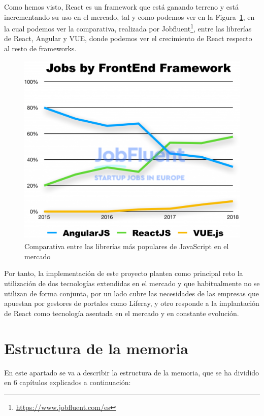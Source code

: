 \documentclass[a4paper, 12pt]{book}
\begin{document}
\vspace{5mm} %
Como hemos visto, React es un framework que está ganando terreno y está incrementando su uso en el mercado, tal y como podemos ver en la Figura~\ref{fig:react_mercado}, en la cual podemos ver la comparativa, realizada por Jobfluent\footnote{\url{https://www.jobfluent.com/es}}, entre las librerías de React, Angular y VUE, donde podemos ver el crecimiento de React respecto al resto de frameworks.
\begin{figure}[h]
  \centering
  \includegraphics{img_usadas/react_mercado.png}
  \caption{Comparativa entre las librerías más populares de JavaScript en el mercado}
  \label{fig:react_mercado}
\end{figure}

\vspace{5mm}
Por tanto, la implementación de este proyecto plantea como principal reto la utilización de dos tecnologías extendidas en el mercado y que habitualmente no se utilizan de forma conjunta, por un lado cubre las necesidades de las empresas que apuestan por gestores de portales como Liferay, y otro responde a la implantación de React como tecnología asentada en el mercado y en constante evolución.


\section{Estructura de la memoria}
\label{sec:estructura}
En este apartado se va a describir la estructura de la memoria, que se ha dividido en 6 capítulos explicados a continuación:
\end{document}
